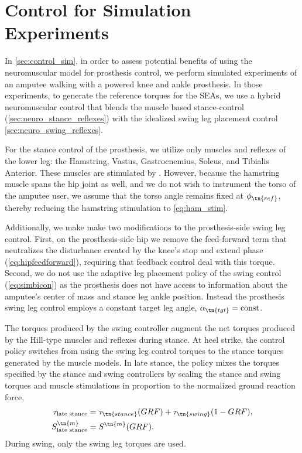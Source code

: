 \section{Control for Simulation Experiments}
In \cref{sec:control_sim}, in order to assess potential benefits of using the
neuromuscular model for prosthesis control, we perform simulated experiments of
an amputee walking with a powered knee and ankle prosthesis. In those
experiments, to generate the reference torques for the SEAs, we use a hybrid
neuromuscular control that blends the muscle based stance-control
(\cref{sec:neuro_stance_reflexes}) with the idealized swing leg placement
control \cref{sec:neuro_swing_reflexes}. 

For the stance control of the prosthesis, we utilize only muscles and reflexes
of the lower leg: the Hamstring, Vastus, Gastrocnemius, Soleus, and Tibialis
Anterior. These muscles are stimulated by
. However, because the hamstring muscle
spans the hip joint as well, and we do not wish to instrument the torso of the
amputee user, we assume that the torso angle remains fixed at $\phi_\tn{ref}$, 
thereby reducing the hamstring stimulation to \cref{eq:ham_stim}.

Additionally, we make make two modifications to the prosthesis-side swing leg
control. First, on the prosthesis-side hip we remove the feed-forward term that
neutralizes the disturbance created by the knee's stop and extend phase
(\cref{eq:hipfeedforward}), requiring that feedback control deal with this
torque.  Second, we do not use the adaptive leg placement policy of the swing
control (\cref{eq:simbicon}) as the prosthesis does not have access to
information about the amputee's center of mass and stance leg ankle position.
Instead the prosthesis swing leg control employs a constant target leg angle,
$\alpha_\tn{tgt} = \mathrm{const}$.

The torques produced by the swing controller augment the net torques produced by
the Hill-type muscles and reflexes during stance. At heel strike, the control
policy switches from using the swing leg control torques to the stance torques
generated by the muscle models. In late stance, the policy mixes the torques
specified by the stance and swing controllers by scaling the stance and swing
torques and muscle stimulations in proportion to the normalized ground reaction
force,
\begin{align}
    \tau_\textrm{late stance} &= \tau_\tn{stance}(GRF) +
    \tau_\tn{swing}(1 - GRF), \label{eq:stance_grf_trans}\\ 
    S^\tn{m}_\textrm{late stance}  &= S^\tn{m}(GRF).\label{eq:swing_grf_trans}
\end{align}
During swing, only the swing leg torques are used.

